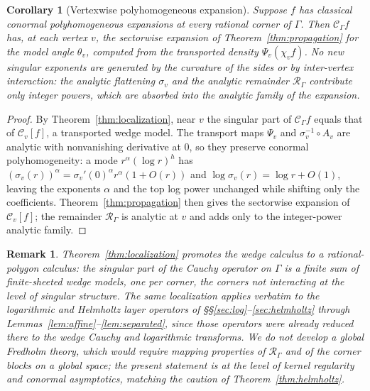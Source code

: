 \documentclass[pdflatex,sn-mathphys-num]{sn-jnl}%
\newcommand{\Cau}{\mathcal{C}}
\theoremstyle{thmstyleone}
\theoremstyle{thmstyletwo}
\newtheorem{remark}{Remark}
\newtheorem{corollary}[theorem]{Corollary}
\theoremstyle{thmstylethree}
\begin{document}
\begin{corollary}[Vertexwise polyhomogeneous expansion]\label{cor:vertexwise}
Suppose $f$ has classical conormal polyhomogeneous expansions at every rational
corner of $\Gamma$. Then $\Cau_\Gamma f$ has, at each vertex $v$, the sectorwise
expansion of Theorem~\ref{thm:propagation} for the model angle $\theta_v$,
computed from the transported density $\Psi_v(\chi_v f)$. No new singular
exponents are generated by the curvature of the sides or by inter-vertex
interaction: the analytic flattening $\sigma_v$ and the analytic remainder
$\mathcal R_\Gamma$ contribute only integer powers, which are absorbed into the
analytic family of the expansion.
\end{corollary}

\begin{proof}
By Theorem~\ref{thm:localization}, near $v$ the singular part of $\Cau_\Gamma f$
equals that of $\Cau_v[f]$, a transported wedge model. The transport maps
$\Psi_v$ and $\sigma_v^{-1}\!\circ A_v$ are analytic with nonvanishing
derivative at $0$, so they preserve conormal polyhomogeneity: a mode
$r^{\alpha}(\log r)^{h}$ has $(\sigma_v(r))^{\alpha}=\sigma_v'(0)^{\alpha}
r^{\alpha}(1+O(r))$ and $\log\sigma_v(r)=\log r+O(1)$, leaving the exponents
$\alpha$ and the top log power unchanged while shifting only the coefficients.
Theorem~\ref{thm:propagation} then gives the sectorwise expansion of
$\Cau_v[f]$; the remainder $\mathcal R_\Gamma$ is analytic at $v$ and adds only
to the integer-power analytic family.
\end{proof}

\begin{remark}
Theorem~\ref{thm:localization} promotes the wedge calculus to a rational-polygon
calculus: the singular part of the Cauchy operator on $\Gamma$ is a finite sum
of finite-sheeted wedge models, one per corner, the corners not interacting at
the level of singular structure. The same localization applies verbatim to the
logarithmic and Helmholtz layer operators of \S\S\ref{sec:log}--\ref{sec:helmholtz}
through Lemmas~\ref{lem:affine}--\ref{lem:separated}, since those operators were
already reduced there to the wedge Cauchy and logarithmic transforms. We do not
develop a global Fredholm theory, which would require mapping properties of
$\mathcal R_\Gamma$ and of the corner blocks on a global space; the present
statement is at the level of kernel regularity and conormal asymptotics,
matching the caution of Theorem~\ref{thm:helmholtz}.
\end{remark}
\end{document}
